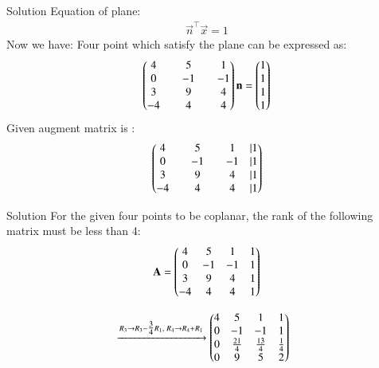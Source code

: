 \documentclass{beamer}
\begin{document}
\begin{frame}{Solution}
Equation of plane:
\begin{align}
    \vec{n}^\top\vec{x}=1
\end{align}
Now we have:
Four point which satisfy the plane can be expressed as:
\begin{align}
    \begin{pmatrix}4 && 5 && 1 \\
           0 && -1 && -1 \\
           3 && 9 && 4 \\
           -4 && 4 && 4 \end{pmatrix} \mathbf{n}=\begin{pmatrix}1 \\ 1 \\ 1 \\1\end{pmatrix}      
\end{align}
Given augment matrix is :
\begin{align}
    \begin{pmatrix}4 && 5 && 1 &|1\\
           0 && -1 && -1&|1 \\
           3 && 9 && 4 &|1\\
           -4 && 4 && 4 &|1\end{pmatrix}
\end{align}
\end{frame}
\begin{frame}{Solution}
    For the given four points to be coplanar, the rank of the following matrix must be less than 4:
\begin{align}
\mathbf{A}=\begin{pmatrix} 
4 & 5 & 1 & 1\\
0 & -1 & -1 & 1 \\
3 & 9 & 4 & 1\\
-4 & 4 & 4 & 1 
\end{pmatrix}
\end{align}

\begin{align}
&\xrightarrow{R_3 \to R_3 - \tfrac{3}{4}R_1,\; R_4 \to R_4 + R_1}
\begin{pmatrix}
4 & 5 & 1 & 1 \\
0 & -1 & -1 & 1 \\
0 & \tfrac{21}{4} & \tfrac{13}{4} & \tfrac{1}{4} \\
0 & 9 & 5 & 2
\end{pmatrix}
\end{align}
\end{frame}
\end{document}
